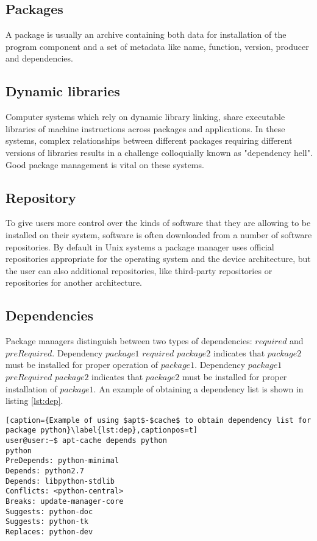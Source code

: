 \subsection*{Packages}
A package is usually an archive containing both data for installation of the program component and a set of metadata like name, function, version, producer and dependencies.
\subsection*{Dynamic libraries}
Computer systems which rely on dynamic library linking, share executable libraries of machine instructions across packages and applications. 
In these systems, complex relationships between different packages requiring different versions of libraries results in a challenge colloquially known as "dependency hell".
Good package management is vital on these systems.
\subsection*{Repository}
To give users more control over the kinds of software that they are allowing to be installed on their system, software is often downloaded from a number of software repositories.
By default in Unix systems a package manager uses official repositories appropriate for the operating system and the device architecture, but the user can also additional repositories, like third-party repositories or repositories for another architecture.
\subsection*{Dependencies} \label{subs:dep}
Package managers distinguish between two types of dependencies: $required$ and $preRequired$.
Dependency $package1$ $required$ $package2$ indicates that $package2$ must be installed for proper operation of $package1$.
Dependency $package1$ $preRequired$ $package2$ indicates that $package2$ must be installed for proper installation of $package1$.
An example of obtaining a dependency list is shown in listing \ref{lst:dep}.
\begin{lstlisting}[caption={Example of using $apt$-$cache$ to obtain dependency list for package python}\label{lst:dep},captionpos=t] 
user@user:~$ apt-cache depends python
python
PreDepends: python-minimal
Depends: python2.7
Depends: libpython-stdlib
Conflicts: <python-central>
Breaks: update-manager-core
Suggests: python-doc
Suggests: python-tk
Replaces: python-dev
\end{lstlisting}
